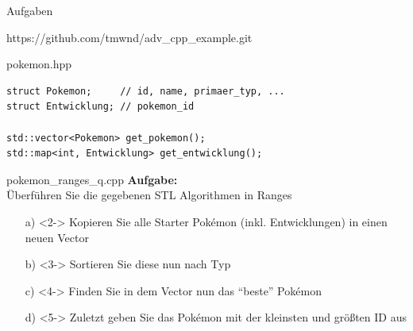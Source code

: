 \begin{frame}{Aufgaben}
    \begin{center}
        https://github.com/tmwnd/adv\_cpp\_example.git
    \end{center}
\end{frame}

\begin{frame}[fragile]{pokemon.hpp}
    \begin{verbatim}
struct Pokemon;     // id, name, primaer_typ, ...
struct Entwicklung; // pokemon_id

std::vector<Pokemon> get_pokemon();
std::map<int, Entwicklung> get_entwicklung();
    \end{verbatim}
\end{frame}



\begin{frame}{pokemon\_ranges\_q.cpp}
    \textbf{Aufgabe:}\\
    Überführen Sie die gegebenen STL Algorithmen in Ranges

    \vspace{1.5em}

    \begin{enumerate} %
        \item[a)]<2-> Kopieren Sie alle Starter Pokémon (inkl. Entwicklungen) in einen neuen Vector
        \item[b)]<3-> Sortieren Sie diese nun nach Typ
        \item[c)]<4-> Finden Sie in dem Vector nun das \enquote{beste} Pokémon
        \item[d)]<5-> Zuletzt geben Sie das Pokémon mit der kleinsten und größten ID aus
    \end{enumerate}
\end{frame}

